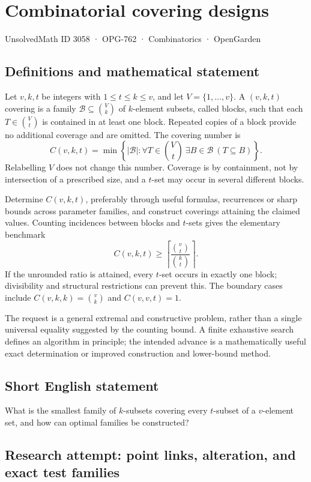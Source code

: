 \documentclass[11pt,a4paper]{article}
\begin{document}
\section*{Combinatorial covering designs}\label{3058}
{\small UnsolvedMath ID 3058 · OPG-762 · Combinatorics · OpenGarden}
\subsection{Definitions and mathematical statement}
Let $v,k,t$ be integers with $1\le t\le k\le v$, and let
$V=\{1,\ldots,v\}$. A $(v,k,t)$ covering is a family
$\mathcal B\subseteq\binom Vk$ of $k$-element subsets, called blocks,
such that each $T\in\binom Vt$ is contained in at least one block.
Repeated copies of a block provide no additional coverage and are omitted.
The covering number is
\[
 C(v,k,t)=\min\left\{|\mathcal B|:
 \forall T\in\binom Vt\ \exists B\in\mathcal B\ (T\subseteq B)\right\}.
\]
Relabelling $V$ does not change this number. Coverage is by containment,
not by intersection of a prescribed size, and a $t$-set may occur in
several different blocks.

Determine $C(v,k,t)$, preferably through useful formulas, recurrences or
sharp bounds across parameter families, and construct coverings attaining
the claimed values. Counting incidences between blocks and $t$-sets gives
the elementary benchmark
\[
 C(v,k,t)\ge
 \left\lceil\frac{\binom vt}{\binom kt}\right\rceil.
\]
If the unrounded ratio is attained, every $t$-set occurs in exactly one
block; divisibility and structural restrictions can prevent this.
The boundary cases include $C(v,k,k)=\binom vk$ and $C(v,v,t)=1$.

The request is a general extremal and constructive problem, rather than
a single universal equality suggested by the counting bound. A finite
exhaustive search defines an algorithm in principle; the intended advance
is a mathematically useful exact determination or improved construction
and lower-bound method.
\subsection{Short English statement}
What is the smallest family of $k$-subsets covering every $t$-subset of a $v$-element set, and how can optimal families be constructed?
\subsection{Research attempt: point links, alteration, and exact test families}
\end{document}
